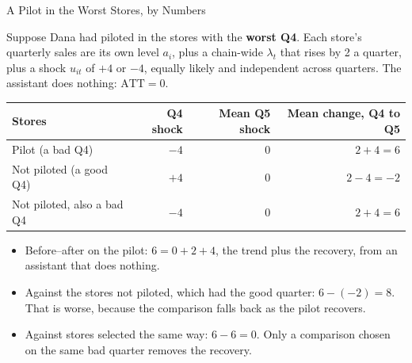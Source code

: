 \documentclass[aspectratio=169, 11pt, handout]{beamer}
\newcommand{\ATT}{\text{ATT}}
\begin{document}
\begin{frame}{A Pilot in the Worst Stores, by Numbers}

Suppose Dana had piloted in the stores with the \textbf{worst Q4}. Each store's quarterly sales are its own level $a_i$, plus a chain-wide $\lambda_t$ that rises by 2 a quarter, plus a shock $u_{it}$ of $+4$ or $-4$, equally likely and independent across quarters. The assistant does nothing: $\ATT = 0$.

\begin{center}
\small
\begin{tabular}{lrrr}
\toprule
\textbf{Stores} & \textbf{Q4 shock} & \textbf{Mean Q5 shock} & \textbf{Mean change, Q4 to Q5} \\
\midrule
Pilot (a bad Q4) & $-4$ & 0 & $2 + 4 = 6$ \\
Not piloted (a good Q4) & $+4$ & 0 & $2 - 4 = -2$ \\
Not piloted, also a bad Q4 & $-4$ & 0 & $2 + 4 = 6$ \\
\bottomrule
\end{tabular}
\end{center}

\begin{itemize}
  \item Before--after on the pilot: $6 = 0 + 2 + 4$, the trend plus the recovery, from an assistant that does nothing.
  \item Against the stores not piloted, which had the good quarter: $6 - (-2) = 8$. That is worse, because the comparison falls back as the pilot recovers.
  \item Against stores selected the same way: $6 - 6 = 0$. Only a comparison chosen on the same bad quarter removes the recovery.
\end{itemize}
\end{frame}
\end{document}
